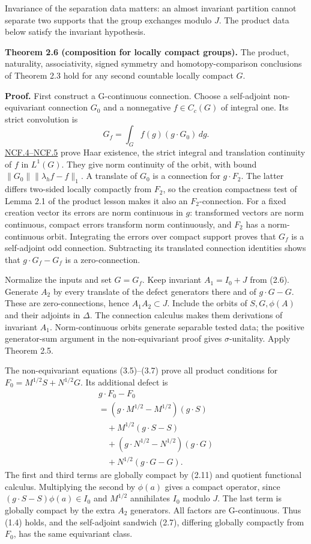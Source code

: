\documentclass[
  11pt,
]{article}
\begin{document}
Invariance of the separation data matters: an almost invariant partition
cannot separate two supports that the group exchanges modulo \(J\). The
product data below satisfy the invariant hypothesis.

\textbf{Theorem 2.6 (composition for locally compact groups).} The
product, naturality, associativity, signed symmetry and
homotopy-comparison conclusions of Theorem 2.3 hold for any second
countable locally compact \(G\).

\textbf{Proof.} First construct a G-continuous connection. Choose a
self-adjoint non-equivariant connection \(G_0\) and a nonnegative
\(f\in C_c(G)\) of integral one. Its strict convolution is \[
G_f=\int_G f(g)(g\cdot G_0)\,dg.
\tag{2.15}
\]
\href{supporting/noncompact-foundations/noncompact-foundations.html\#ncf-004}{NCF.4--NCF.5}
prove Haar existence, the strict integral and translation continuity of
\(f\) in \(L^1(G)\). They give norm continuity of the orbit, with bound
\(\|G_0\|\|\lambda_hf-f\|_1\). A translate of \(G_0\) is a connection
for \(g\cdot F_2\). The latter differs two-sided locally compactly from
\(F_2\), so the creation compactness test of Lemma 2.1 of the product
lesson makes it also an \(F_2\)-connection. For a fixed creation vector
its errors are norm continuous in \(g\): transformed vectors are norm
continuous, compact errors transform norm continuously, and \(F_2\) has
a norm-continuous orbit. Integrating the errors over compact support
proves that \(G_f\) is a self-adjoint odd connection. Subtracting its
translated connection identities shows that \(g\cdot G_f-G_f\) is a
zero-connection.

Normalize the inputs and set \(G=G_f\). Keep invariant \(A_1=I_0+J\)
from (2.6). Generate \(A_2\) by every translate of the defect generators
there and of \(g\cdot G-G\). These are zero-connections, hence
\(A_1A_2\subset J\). Include the orbits of \(S,G,\phi(A)\) and their
adjoints in \(\Delta\). The connection calculus makes them derivations
of invariant \(A_1\). Norm-continuous orbits generate separable tested
data; the positive generator-sum argument in the non-equivariant proof
gives \(\sigma\)-unitality. Apply Theorem 2.5.

The non-equivariant equations (3.5)--(3.7) prove all product conditions
for \(F_0=M^{1/2}S+N^{1/2}G\). Its additional defect is \[
\begin{gathered}
g\cdot F_0-F_0\\
 =(g\cdot M^{1/2}-M^{1/2})(g\cdot S)\\
 \quad+M^{1/2}(g\cdot S-S)\\
 \quad+(g\cdot N^{1/2}-N^{1/2})(g\cdot G)\\
 \quad+N^{1/2}(g\cdot G-G).
\end{gathered}
\tag{2.16}
\] The first and third terms are globally compact by (2.11) and quotient
functional calculus. Multiplying the second by \(\phi(a)\) gives a
compact operator, since \((g\cdot S-S)\phi(a)\in I_0\) and \(M^{1/2}\)
annihilates \(I_0\) modulo \(J\). The last term is globally compact by
the extra \(A_2\) generators. All factors are G-continuous. Thus (1.4)
holds, and the self-adjoint sandwich (2.7), differing globally compactly
from \(F_0\), has the same equivariant class.
\end{document}
